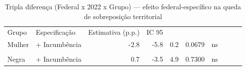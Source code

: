 \begin{table}[!h]
\centering
\caption{Tripla diferença (Federal x 2022 x Grupo) — efeito federal-específico na queda de sobreposição territorial}
\centering
\begin{tabular}[t]{llrrrrl}
\toprule
Grupo & Especificação & Estimativa (p.p.) & IC 95%
\midrule
{} &  &  &  &  &  & \\
Mulher & + Incumbência & -2.8 & -5.8 & 0.2 & 0.0679 & ns\\
 &  &  &  &  &  & \\
Negra & + Incumbência & 0.7 & -3.5 & 4.9 & 0.7300 & ns\\
\bottomrule
\end{tabular}
\end{table}

